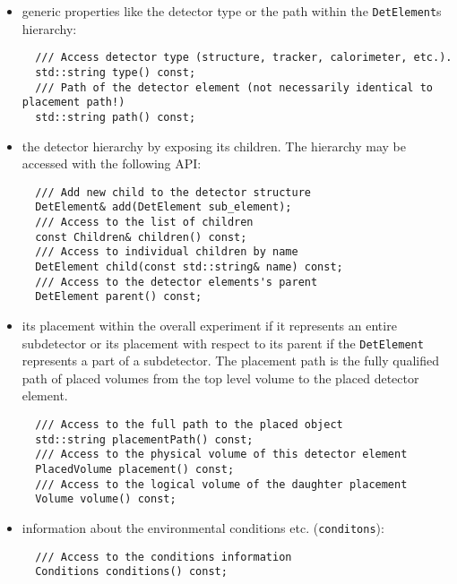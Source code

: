 \begin{itemize}
\item generic properties like the detector type or the path within the \texttt{DetElement}s hierarchy:
\begin{verbatim}
  /// Access detector type (structure, tracker, calorimeter, etc.).
  std::string type() const;
  /// Path of the detector element (not necessarily identical to placement path!)
  std::string path() const;
\end{verbatim}

\item the detector hierarchy by exposing its children. The hierarchy may be  accessed with the following API:
\begin{verbatim}
  /// Add new child to the detector structure
  DetElement& add(DetElement sub_element);
  /// Access to the list of children
  const Children& children() const;
  /// Access to individual children by name
  DetElement child(const std::string& name) const;
  /// Access to the detector elements's parent
  DetElement parent() const;
\end{verbatim}

\item its placement within the overall experiment if it represents an entire subdetector or its placement with respect to its parent if the \texttt{DetElement} represents a part of a subdetector. The placement path is the fully qualified path of placed volumes  from the top level volume to the placed detector element. %
\begin{verbatim}
  /// Access to the full path to the placed object
  std::string placementPath() const;
  /// Access to the physical volume of this detector element
  PlacedVolume placement() const;
  /// Access to the logical volume of the daughter placement
  Volume volume() const;
\end{verbatim}

\item information about the environmental conditions etc. (\texttt{conditons}):
\begin{verbatim}
  /// Access to the conditions information 
  Conditions conditions() const;
\end{verbatim}


\end{itemize}
